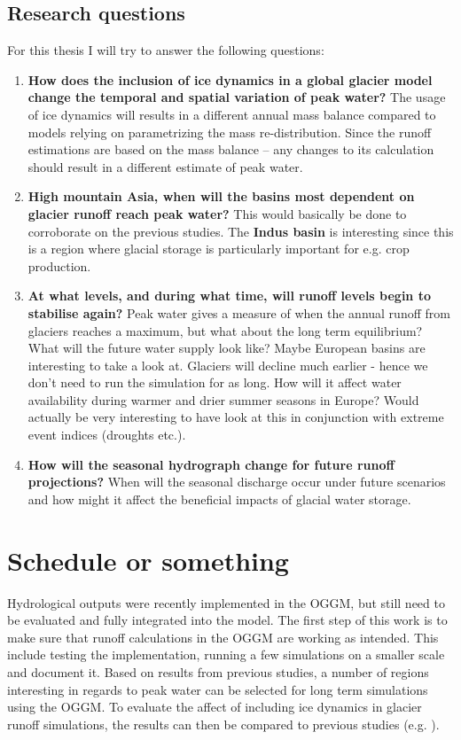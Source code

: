 \documentclass[12pt, a4paper]{article}
\begin{document}
\subsection{Research questions}
For this thesis I will try to answer the following questions:
\begin{enumerate}
    \item \textbf{How does the inclusion of ice dynamics in a global glacier
    model change the temporal and spatial variation of peak water?} The usage of
    ice dynamics will results in a different annual mass balance compared to
    models relying on parametrizing the mass re-distribution. Since the runoff
    estimations are based on the mass balance -- any changes to its calculation
    should result in a different estimate of peak water.
    \item \textbf{High mountain Asia, when will the basins most dependent on
    glacier runoff reach peak water?} This would basically be done to
    corroborate on the previous studies. The \textbf{Indus
    basin} is interesting since this is a region where glacial storage is
    particularly important for e.g. crop production.
    \item \textbf{At what levels, and during what time, will runoff levels
    begin to stabilise again?} Peak water gives a measure of when the annual
    runoff from glaciers reaches a maximum, but what about the long term
    equilibrium? What will the future water supply look like? Maybe European
    basins are interesting to take a look at. Glaciers will decline much earlier
    - hence we don't need to run the simulation for as long. How will it affect
    water availability during warmer and drier summer seasons in Europe? Would
    actually be very interesting to have look at this in conjunction with
    extreme event indices (droughts etc.).
    \item \textbf{How will the seasonal hydrograph change for future runoff
    projections?} When will the seasonal discharge occur under future scenarios
    and how might it affect the beneficial impacts of glacial water storage.
\end{enumerate}

\section{Schedule or something}
Hydrological outputs were recently implemented in the OGGM, but still need to be
evaluated and fully integrated into the model. The first step of this work is to
make sure that runoff calculations in the OGGM are working as intended. This
include testing the implementation, running a few simulations on a smaller scale
and document it. Based on results from previous studies, a number of regions
interesting in regards to peak water can be selected for long term simulations
using the OGGM. To evaluate the affect of including ice dynamics in glacier
runoff simulations, the results can then be compared to previous studies (e.g.
\cite{rounceGlacierMassChange2020,hussGlobalscaleHydrologicalResponse2018}). 
\end{document}
